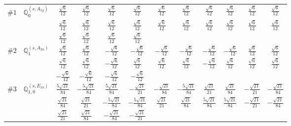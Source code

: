 \documentclass[fleqn,9pt,landscape]{jsarticle}
\begin{document}
\begin{center}
\begin{longtable}{lcccccccccc}
$ \#1\quad \mathbb{Q}_{0}^{(s,A_{1g})} $ & $ \frac{\sqrt{6}}{12} $ & $ \frac{\sqrt{6}}{12} $ & $ \frac{\sqrt{6}}{12} $ & $ \frac{\sqrt{6}}{12} $ & $ \frac{\sqrt{6}}{12} $ & $ \frac{\sqrt{6}}{12} $ & $ \frac{\sqrt{6}}{12} $ & $ \frac{\sqrt{6}}{12} $ & $ \frac{\sqrt{6}}{12} $ & $ \frac{\sqrt{6}}{12} $ \\
& $ \frac{\sqrt{6}}{12} $ & $ \frac{\sqrt{6}}{12} $ & $ \frac{\sqrt{6}}{12} $ & $ \frac{\sqrt{6}}{12} $ & $ \frac{\sqrt{6}}{12} $ & $ \frac{\sqrt{6}}{12} $ & $ \frac{\sqrt{6}}{12} $ & $ \frac{\sqrt{6}}{12} $ & $ \frac{\sqrt{6}}{12} $ & $ \frac{\sqrt{6}}{12} $ \\
& $ \frac{\sqrt{6}}{12} $ & $ \frac{\sqrt{6}}{12} $ & $ \frac{\sqrt{6}}{12} $ & $ \frac{\sqrt{6}}{12} $ & $  $ & $  $ & $  $ & $  $ & $  $ & $  $ \\ \hline
$ \#2\quad \mathbb{Q}_{1}^{(s,A_{2u})} $ & $ \frac{\sqrt{6}}{12} $ & $ \frac{\sqrt{6}}{12} $ & $ - \frac{\sqrt{6}}{12} $ & $ - \frac{\sqrt{6}}{12} $ & $ - \frac{\sqrt{6}}{12} $ & $ - \frac{\sqrt{6}}{12} $ & $ - \frac{\sqrt{6}}{12} $ & $ - \frac{\sqrt{6}}{12} $ & $ \frac{\sqrt{6}}{12} $ & $ \frac{\sqrt{6}}{12} $ \\
& $ \frac{\sqrt{6}}{12} $ & $ \frac{\sqrt{6}}{12} $ & $ - \frac{\sqrt{6}}{12} $ & $ \frac{\sqrt{6}}{12} $ & $ \frac{\sqrt{6}}{12} $ & $ \frac{\sqrt{6}}{12} $ & $ - \frac{\sqrt{6}}{12} $ & $ \frac{\sqrt{6}}{12} $ & $ \frac{\sqrt{6}}{12} $ & $ \frac{\sqrt{6}}{12} $ \\
& $ - \frac{\sqrt{6}}{12} $ & $ - \frac{\sqrt{6}}{12} $ & $ - \frac{\sqrt{6}}{12} $ & $ - \frac{\sqrt{6}}{12} $ & $  $ & $  $ & $  $ & $  $ & $  $ & $  $ \\ \hline
$ \#3\quad \mathbb{Q}_{1,0}^{(s,E_{1u})} $ & $ \frac{5 \sqrt{21}}{84} $ & $ - \frac{5 \sqrt{21}}{84} $ & $ \frac{5 \sqrt{21}}{84} $ & $ - \frac{\sqrt{21}}{21} $ & $ - \frac{\sqrt{21}}{84} $ & $ - \frac{5 \sqrt{21}}{84} $ & $ \frac{\sqrt{21}}{21} $ & $ \frac{\sqrt{21}}{84} $ & $ - \frac{\sqrt{21}}{21} $ & $ - \frac{\sqrt{21}}{84} $ \\
& $ \frac{\sqrt{21}}{84} $ & $ \frac{\sqrt{21}}{21} $ & $ - \frac{5 \sqrt{21}}{84} $ & $ - \frac{5 \sqrt{21}}{84} $ & $ \frac{\sqrt{21}}{21} $ & $ \frac{\sqrt{21}}{84} $ & $ \frac{5 \sqrt{21}}{84} $ & $ \frac{5 \sqrt{21}}{84} $ & $ - \frac{\sqrt{21}}{21} $ & $ - \frac{\sqrt{21}}{84} $ \\
& $ \frac{\sqrt{21}}{21} $ & $ \frac{\sqrt{21}}{84} $ & $ - \frac{\sqrt{21}}{84} $ & $ - \frac{\sqrt{21}}{21} $ & $  $ & $  $ & $  $ & $  $ & $  $ & $  $ \\ \hline

\end{longtable}
\end{center}
\end{document}
